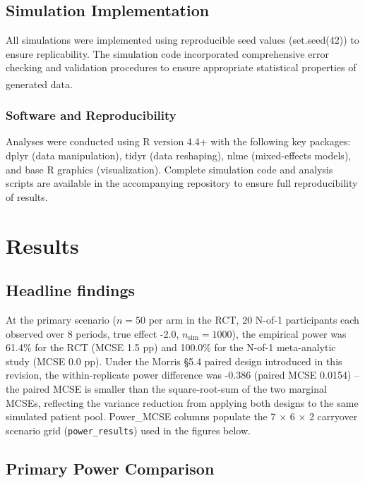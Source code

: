 \documentclass[
  11pt,
]{article}
\begin{document}
\subsection{Simulation Implementation}\label{simulation-implementation}

All simulations were implemented using reproducible seed values
(set.seed(42)) to ensure replicability. The simulation code incorporated
comprehensive error checking and validation procedures to ensure
appropriate statistical properties of generated
data\textsuperscript{}.

\subsubsection{Software and
Reproducibility}\label{software-and-reproducibility}

Analyses were conducted using R version 4.4+ with the following key
packages: dplyr (data manipulation), tidyr (data reshaping), nlme
(mixed-effects models), and base R graphics (visualization). Complete
simulation code and analysis scripts are available in the accompanying
repository to ensure full reproducibility of results.

\section{Results}\label{results}

\subsection{Headline findings}\label{headline-findings}

At the primary scenario (\(n = 50\) per arm in the RCT, 20 N-of-1
participants each observed over 8 periods, true effect -2.0,
\(n_{\mathrm{sim}} =
1000\)), the empirical power was 61.4\% for the RCT (MCSE 1.5 pp) and
100.0\% for the N-of-1 meta-analytic study (MCSE 0.0 pp). Under the
Morris §5.4 paired design introduced in this revision, the
within-replicate power difference was -0.386 (paired MCSE 0.0154) -- the
paired MCSE is smaller than the square-root-sum of the two marginal
MCSEs, reflecting the variance reduction from applying both designs to
the same simulated patient pool. Power\_MCSE columns populate the 7
\(\times\) 6 \(\times\) 2 carryover scenario grid
(\texttt{power\_results}) used in the figures below.

\subsection{Primary Power Comparison}\label{primary-power-comparison}
\end{document}
